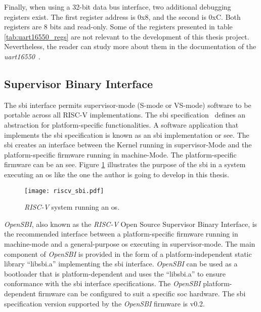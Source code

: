 Finally, when using a 32-bit data bus interface, two additional debugging registers exist. The first register address is 0x8, and the second is 0xC. Both registers are 8 bits and read-only. Some of the registers presented in table \ref{tab:uart16550_regs} are not relevant to the development of this thesis project. Nevertheless, the reader can study more about them in the documentation of the \textit{\acrshort{uart}16550}~\cite{gorban2002uart}.

\subsection{Supervisor Binary Interface}
\label{subsection:sbi}
The \acrfull{sbi} interface permits supervisor-mode (S-mode or VS-mode) software to be portable across all RISC-V implementations. The \acrfull{sbi} specification~\cite{sbi_riscv_spec} defines an abstraction for platform-specific functionalities. A software application that implements the \acrfull{sbi} specification is known as an \acrshort{sbi} implementation or \acrfull{see}. The \acrshort{sbi} creates an interface between the Kernel running in \acrshort{supervisor}-Mode and the platform-specific firmware running in \acrshort{machine}-Mode. The platform-specific firmware can be an \acrlong{see}. Figure \ref{fig:riscv_sbi} illustrates the purpose of the \acrshort{sbi} in a system executing an \acrshort{os} like the one the author is going to develop in this thesis.

\begin{figure}[!h]
    \centering
    \texttt{[image: riscv\_sbi.pdf]}
    \caption{\textit{RISC-V} system running an \acrlong{os}.}
    \label{fig:riscv_sbi}
\end{figure}

\textit{OpenSBI}, also known as the \textit{RISC-V} Open Source Supervisor Binary Interface, is the recommended interface between a platform-specific firmware running in \acrshort{machine}-mode and a general-purpose \acrshort{os} executing in \acrshort{supervisor}-mode. The main component of \textit{OpenSBI} is provided in the form of a platform-independent static library \enquote{libsbi.a} implementing the \acrshort{sbi} interface. \textit{OpenSBI} can be used as a bootloader that is platform-dependent and uses the \enquote{libsbi.a} to ensure conformance with the \acrshort{sbi} interface specifications. The \textit{OpenSBI} platform-dependent firmware can be configured to suit a specific \acrlong{soc} hardware. The \acrshort{sbi} specification version supported by the \textit{OpenSBI} firmware is v0.2.

